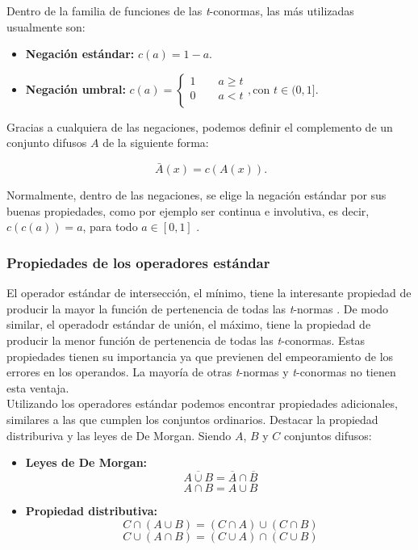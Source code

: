 Dentro de la familia de funciones de las \textit{t}-conormas, las más utilizadas usualmente son:

\begin{itemize}
\item \textbf{Negación estándar:} $c(a)= 1-a$.
\item \textbf{Negación umbral:} $c(a)= \left\lbrace
  \begin{array}{l}
     1 \qquad a \geq t \\
     0 \qquad a < t \\
  \end{array}
  \right. , \textrm{con } t\in (0,1]$.
\end{itemize}

Gracias a cualquiera de las negaciones, podemos definir el complemento de un conjunto difusos $A$ de la siguiente forma:

\[
\ \bar{A}(x)= c(A(x)).
\]

Normalmente, dentro de las negaciones, se elige la negación estándar por sus buenas propiedades, como por ejemplo ser continua e involutiva, es decir, $c\left(c\left(a\right)\right)=a$, para todo $a \in [0,1]$ .

\subsubsection{Propiedades de los operadores estándar}

El operador estándar de intersección, el mínimo, tiene la interesante propiedad de producir la mayor la función de pertenencia de todas las \textit{t}-normas \cite{Ross}. De modo similar, el operadodr estándar de unión, el máximo, tiene la propiedad de producir la menor función de pertenencia de todas las \textit{t}-conormas. Estas propiedades tienen su importancia ya que previenen del empeoramiento de los errores en los operandos. La mayoría de otras \textit{t}-normas y \textit{t}-conormas no tienen esta ventaja.\\

Utilizando los operadores estándar podemos encontrar propiedades adicionales, similares a las que cumplen los conjuntos ordinarios. Destacar la propiedad distriburiva y las leyes de De Morgan. Siendo $A$, $B$ y $C$ conjuntos difusos:

\begin{itemize}
\item \textbf{Leyes de De Morgan:}
\[
\ \overline{A \cup B} = \overline{A} \cap \overline{B}
\]
\[
\ \overline{A \cap B} = \overline{A} \cup \overline{B}
\]
\item \textbf{Propiedad distributiva:}
\[
\ C \cap \left( A \cup B \right) = \left(C \cap A \right) \cup \left(C \cap B \right)
\]
\[
\ C \cup \left( A \cap B \right) = \left(C \cup A \right) \cap \left(C \cup B \right)
\]
\end{itemize}

